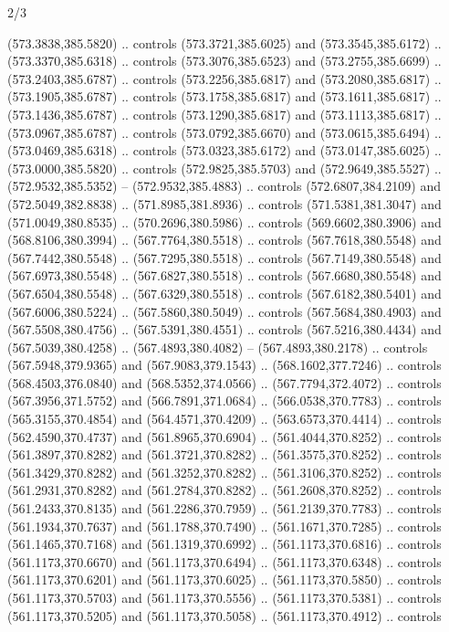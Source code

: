 \begin{flagdescription}{2/3}
\begin{scope}[xshift=0.5\flaglength,yshift=0.5\flagwidth,scale=\flagwidth/495.65]
\begin{scope}[y=0.8pt, x=0.8pt, yscale=-1,shift={(-463.76,-309.78)}]
  (573.3838,385.5820) .. controls (573.3721,385.6025) and (573.3545,385.6172) ..
  (573.3370,385.6318) .. controls (573.3076,385.6523) and (573.2755,385.6699) ..
  (573.2403,385.6787) .. controls (573.2256,385.6817) and (573.2080,385.6817) ..
  (573.1905,385.6787) .. controls (573.1758,385.6817) and (573.1611,385.6817) ..
  (573.1436,385.6787) .. controls (573.1290,385.6817) and (573.1113,385.6817) ..
  (573.0967,385.6787) .. controls (573.0792,385.6670) and (573.0615,385.6494) ..
  (573.0469,385.6318) .. controls (573.0323,385.6172) and (573.0147,385.6025) ..
  (573.0000,385.5820) .. controls (572.9825,385.5703) and (572.9649,385.5527) ..
  (572.9532,385.5352) -- (572.9532,385.4883) .. controls (572.6807,384.2109) and
  (572.5049,382.8838) .. (571.8985,381.8936) .. controls (571.5381,381.3047) and
  (571.0049,380.8535) .. (570.2696,380.5986) .. controls (569.6602,380.3906) and
  (568.8106,380.3994) .. (567.7764,380.5518) .. controls (567.7618,380.5548) and
  (567.7442,380.5548) .. (567.7295,380.5518) .. controls (567.7149,380.5548) and
  (567.6973,380.5548) .. (567.6827,380.5518) .. controls (567.6680,380.5548) and
  (567.6504,380.5548) .. (567.6329,380.5518) .. controls (567.6182,380.5401) and
  (567.6006,380.5224) .. (567.5860,380.5049) .. controls (567.5684,380.4903) and
  (567.5508,380.4756) .. (567.5391,380.4551) .. controls (567.5216,380.4434) and
  (567.5039,380.4258) .. (567.4893,380.4082) -- (567.4893,380.2178) .. controls
  (567.5948,379.9365) and (567.9083,379.1543) .. (568.1602,377.7246) .. controls
  (568.4503,376.0840) and (568.5352,374.0566) .. (567.7794,372.4072) .. controls
  (567.3956,371.5752) and (566.7891,371.0684) .. (566.0538,370.7783) .. controls
  (565.3155,370.4854) and (564.4571,370.4209) .. (563.6573,370.4414) .. controls
  (562.4590,370.4737) and (561.8965,370.6904) .. (561.4044,370.8252) .. controls
  (561.3897,370.8282) and (561.3721,370.8282) .. (561.3575,370.8252) .. controls
  (561.3429,370.8282) and (561.3252,370.8282) .. (561.3106,370.8252) .. controls
  (561.2931,370.8282) and (561.2784,370.8282) .. (561.2608,370.8252) .. controls
  (561.2433,370.8135) and (561.2286,370.7959) .. (561.2139,370.7783) .. controls
  (561.1934,370.7637) and (561.1788,370.7490) .. (561.1671,370.7285) .. controls
  (561.1465,370.7168) and (561.1319,370.6992) .. (561.1173,370.6816) .. controls
  (561.1173,370.6670) and (561.1173,370.6494) .. (561.1173,370.6348) .. controls
  (561.1173,370.6201) and (561.1173,370.6025) .. (561.1173,370.5850) .. controls
  (561.1173,370.5703) and (561.1173,370.5556) .. (561.1173,370.5381) .. controls
  (561.1173,370.5205) and (561.1173,370.5058) .. (561.1173,370.4912) .. controls

\end{scope}
\end{scope}
\end{flagdescription}
